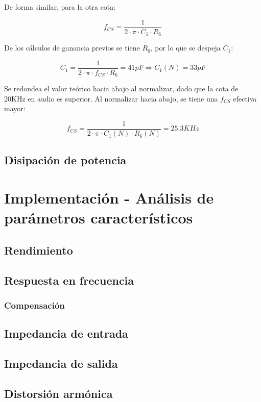 De forma similar, para la otra cota:

\[
f_{CS} = \frac{1}{2 \cdot \pi \cdot C_1 \cdot R_6}
\]

De los cálculos de ganancia previos se tiene $R_6$, por lo que se despeja $C_1$:

\[
C_1 = \frac{1}{2 \cdot \pi \cdot f_{CS} \cdot R_6} = 41pF \Longrightarrow C_1(N) = 33pF
\]

Se redondea el valor teórico hacia abajo al normalizar, dado que la cota de 20KHz en audio es superior. Al normalizar hacia abajo, se tiene una $f_{CS}$ efectiva mayor:

\[
f_{CS} = \frac{1}{2 \cdot \pi \cdot C_1(N) \cdot R_6(N)} = 25.3KHz
\]

\subsection{Disipación de potencia}

\section{Implementación - Análisis de parámetros característicos}

\subsection{Rendimiento}

\subsection{Respuesta en frecuencia}

\subsubsection{Compensación}

\subsection{Impedancia de entrada}

\subsection{Impedancia de salida}

\subsection{Distorsión armónica}


